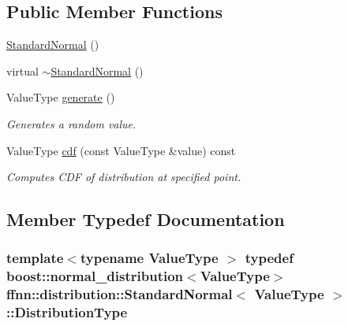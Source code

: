 \subsection*{Public Member Functions}
\begin{DoxyCompactItemize}
\item 
\hyperlink{classffnn_1_1distribution_1_1_standard_normal_afd5ee7c5b2bb5d02c08a0e8974a0cd01}{Standard\-Normal} ()
\item 
virtual \hyperlink{classffnn_1_1distribution_1_1_standard_normal_a010d9798157d92cd6fda1a1aa8998e4c}{$\sim$\-Standard\-Normal} ()
\item 
Value\-Type \hyperlink{classffnn_1_1distribution_1_1_standard_normal_a2e1a226809475bfe488d3eaf519efbc5}{generate} ()
\begin{DoxyCompactList}\small\item\em Generates a random value. \end{DoxyCompactList}\item 
Value\-Type \hyperlink{classffnn_1_1distribution_1_1_standard_normal_abb66db880a0e56edf812ad5d6cd99954}{cdf} (const Value\-Type \&value) const 
\begin{DoxyCompactList}\small\item\em Computes C\-D\-F of distribution at specified point. \end{DoxyCompactList}\end{DoxyCompactItemize}


\subsection{Member Typedef Documentation}
\hypertarget{classffnn_1_1distribution_1_1_standard_normal_ac8e48677daf06074050974b825d6ee7a}{
\subsubsection[{Distribution\-Type}]{\setlength{\rightskip}{0pt plus 5cm}template$<$typename Value\-Type $>$ typedef boost\-::normal\-\_\-distribution$<$Value\-Type$>$ {\bf ffnn\-::distribution\-::\-Standard\-Normal}$<$ Value\-Type $>$\-::{\bf Distribution\-Type}}}\label{classffnn_1_1distribution_1_1_standard_normal_ac8e48677daf06074050974b825d6ee7a}


